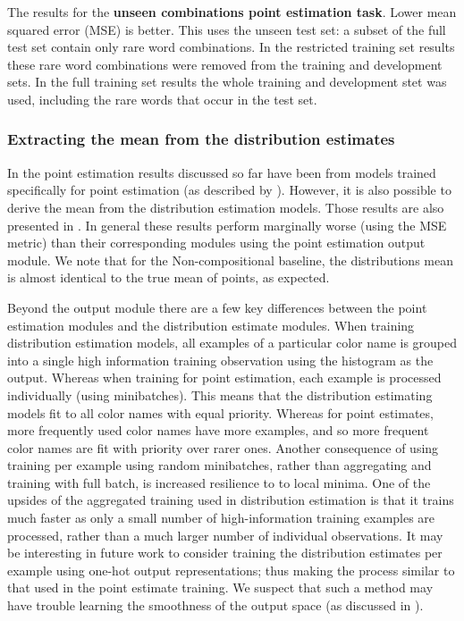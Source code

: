 \documentclass[11pt,a4paper]{article}
\newcommand{\empmodel}{Non-compositional baseline}
\begin{document}
\begin{table}
	\caption{\label{tbl:pointextrapo} The results for the \textbf{unseen combinations point estimation task}. Lower mean squared error (MSE) is better. This uses the unseen test set: a subset of the full test set contain only rare word combinations. In the restricted training set results these rare word combinations were removed from the training and development sets. In the full training set results the whole training and development stet was used, including the rare words that occur in the test set.}
\end{table}

\subsubsection{Extracting the mean from the distribution estimates}

In the point estimation results discussed so far have been from models trained specifically for point estimation (as described by ).
However, it is also possible to derive the mean from the distribution estimation models.
Those results are also presented in .
In general these results perform marginally worse (using the MSE metric) than their corresponding modules using the point estimation output module.
We note that for the \empmodel{}, the distributions mean is almost identical to the true mean of points, as expected.

Beyond the output module there are a few key differences between the point estimation modules and the distribution estimate modules.
When training distribution estimation models, all examples of a particular color name is grouped into a single high information training observation using the histogram as the output.
Whereas when training for point estimation, each example is processed individually (using minibatches).
This means that the distribution estimating models fit to all color names with equal priority. %
Whereas for point estimates, more frequently used color names have more examples, and so more frequent color names are fit with priority over rarer ones.
Another consequence of using training per example using random minibatches, rather than aggregating and training with full batch, is increased resilience to to local minima.
One of the upsides of the aggregated training used in distribution estimation is that it trains much faster as only a small number of high-information training examples are processed, rather than a much larger number of individual observations.
It may be interesting in future work to consider training the distribution estimates per example using one-hot output representations; thus making the process similar to that used in the point estimate training.
We suspect that such a method may have trouble learning the smoothness of the output space (as discussed in ).
\end{document}
